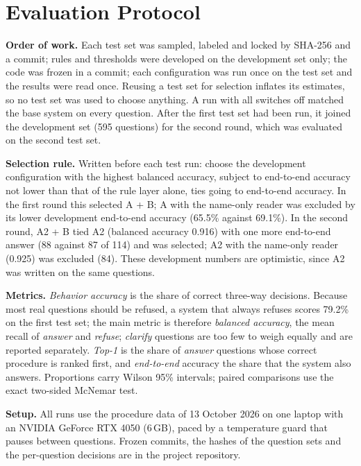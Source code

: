 \section{Evaluation Protocol}

\textbf{Order of work.} Each test set was sampled, labeled and locked by SHA-256 and a commit; rules and thresholds were developed on the
development set only; the code was frozen in a commit; each configuration was run once on the test set and the results were read once.
Reusing a test set for selection inflates its estimates\cite{dwork2015}, so no test set was used to choose anything. A run with all
switches off matched the base system on every question. After the first test set had been run, it joined the development set (595
questions) for the second round, which was evaluated on the second test set.

\textbf{Selection rule.} Written before each test run: choose the development configuration with the highest balanced accuracy, subject to
end-to-end accuracy not lower than that of the rule layer alone, ties going to end-to-end accuracy. In the first round this selected A + B;
A with the name-only reader was excluded by its lower development end-to-end accuracy (65.5\% against 69.1\%). In the second round, A2 + B
tied A2 (balanced accuracy 0.916) with one more end-to-end answer (88 against 87 of 114) and was selected; A2 with the name-only reader
(0.925) was excluded (84). These development numbers are optimistic, since A2 was written on the same questions.

\textbf{Metrics.} \emph{Behavior accuracy} is the share of correct three-way decisions. Because most real questions should be refused, a
system that always refuses scores 79.2\% on the first test set; the main metric is therefore \emph{balanced accuracy}, the mean recall of
\emph{answer} and \emph{refuse}\cite{brodersen2010}; \emph{clarify} questions are too few to weigh equally and are reported separately.
\emph{Top-1} is the share of \emph{answer} questions whose correct procedure is ranked first, and \emph{end-to-end} accuracy the share that
the system also answers. Proportions carry Wilson 95\% intervals\cite{wilson1927}; paired comparisons use the exact two-sided McNemar
test\cite{mcnemar1947,dietterich1998}.

\textbf{Setup.} All runs use the procedure data of 13 October 2026 on one laptop with an NVIDIA GeForce RTX 4050 (6\,GB), paced by a
temperature guard that pauses between questions. Frozen commits, the hashes of the question sets and the per-question decisions are in the
project repository.
